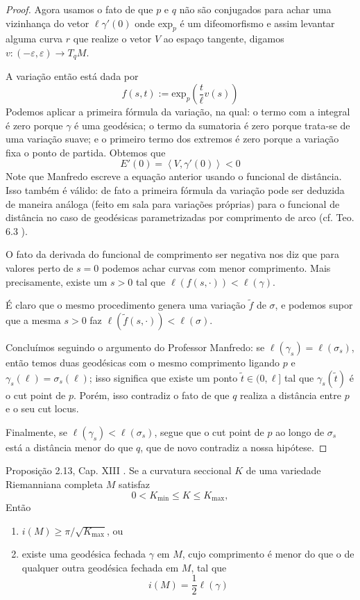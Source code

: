 \begin{proof}
Agora usamos o fato de que $p$ e $q$ não são conjugados para 
achar uma vizinhança do vetor $\ell \gamma'(0)$ onde $\text{exp}_p$ é um
difeomorfismo e assim levantar alguma
curva $r$ que realize o vetor $V$ ao espaço tangente,
 digamos $v:(-\varepsilon,\varepsilon) \to T_q M$.

A variação então está dada por
$$
f(s,t):=\text{exp}_p\left(\frac{t}{\ell}v(s)\right)
$$
Podemos aplicar a primeira fórmula da variação, na qual: o termo com a
integral é zero porque $\gamma$ é uma geodésica; o termo da sumatoria é zero
porque trata-se de uma variação suave; e o primeiro termo dos extremos é zero
porque a variação fixa o ponto de partida. Obtemos que 
$$
E'(0)=\left<V,\gamma'(0)\right><0
$$
Note que Manfredo escreve a equação anterior usando o funcional de distância. 
Isso também é válido: de fato a primeira fórmula da variação pode ser 
deduzida de maneira análoga (feito em sala para variações próprias) 
 para o funcional de distância no caso de geodésicas parametrizadas por 
comprimento de arco (cf. Teo. 6.3 \cite{ler}).

O fato da derivada do funcional de comprimento ser negativa nos diz que para
valores perto de $s=0$ podemos achar curvas com menor comprimento. Mais
precisamente, existe um $s>0$ tal que $\ell(f(s,\cdot))<\ell(\gamma)$.

É claro que o mesmo procedimento genera uma variação $\tilde{f}$ de $\sigma$, e 
podemos supor que a mesma $s>0$ faz $\ell(\tilde{f}(s,\cdot))<\ell(\sigma)$.

Concluímos seguindo o argumento do Professor Manfredo: se 
$\ell(\gamma_s)=\ell(\sigma_s)$, então temos duas geodésicas com o mesmo
comprimento ligando $p$ e $\gamma_s(\ell)=\sigma_s(\ell)$; isso significa 
que existe um ponto $\tilde{t} \in (0,\ell]$ tal que $\gamma_s(\tilde{t})$ é
 o cut point de $p$. Porém, isso contradiz o fato de que $q$ realiza a 
distância entre $p$ e o seu cut locus.

Finalmente, se $\ell(\gamma_s)<\ell(\sigma_s)$, segue que o cut point de $p$
 ao longo de $\sigma_s$ está a distância menor do que $q$, que de novo contradiz
a nossa hipótese.
\end{proof}

\begin{exercise}
\label{exercise-l8-2}
Proposição 2.13, Cap. XIII \cite{doc}. Se a curvatura seccional $K$ de uma
variedade Riemanniana completa $M$ satisfaz
$$
0< K_{\operatorname{min}}\leq K\leq K_{\operatorname{max}},
$$
Então
\begin{enumerate}
\item $i(M) \geq \pi/\sqrt{K_{\operatorname{max}}}$, ou
\item existe uma geodésica fechada $\gamma$ em $M$, cujo comprimento é menor do 
que o de qualquer outra geodésica fechada em $M$, tal que
$$
i(M)=\frac{1}{2}\ell(\gamma)
$$
\end{enumerate}
\end{exercise}

